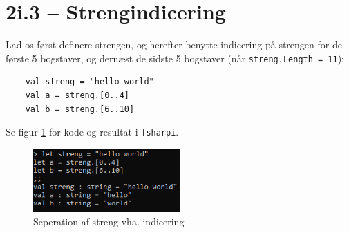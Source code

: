 \documentclass{article}
\begin{document}
\section*{2i.3 -- Strengindicering}
Lad os først definere strengen, og herefter benytte indicering på strengen for de første 5 bogstaver, og dernæst de sidste 5 bogstaver (når \texttt{streng.Length = 11}):\begin{verbatim}
    val streng = "hello world"
    val a = streng.[0..4]
    val b = streng.[6..10]
\end{verbatim}
Se figur \ref{fig:stringindex} for kode og resultat i \texttt{fsharpi}.
\begin{figure}[H]
    \centering
    \includegraphics[width=0.5\textwidth]{cmd_VlnBcCJX7c.png}
    \caption{Seperation af streng vha. indicering}
    \label{fig:stringindex}
\end{figure}
\end{document}
